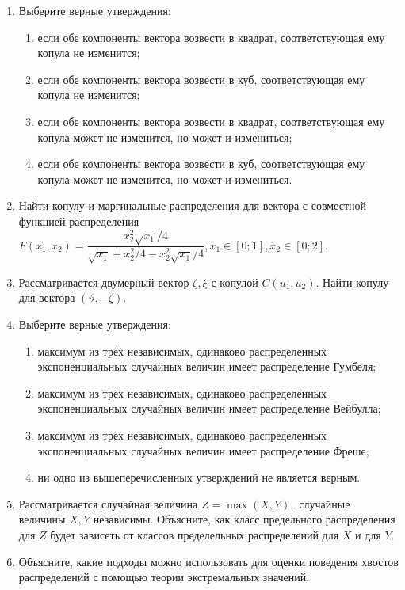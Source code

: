 \documentclass[12pt]{article}
\begin{document}
\begin{enumerate}
\item 
Выберите верные утверждения:
\begin{enumerate}
\setlength\itemsep{-0.15em}
    \item если обе компоненты вектора возвести в квадрат, соответствующая ему копула не изменится;
    \item если обе компоненты вектора возвести в куб, соответствующая ему копула не изменится;
    \item если обе компоненты вектора возвести в квадрат, соответствующая ему копула может не изменится, но может и измениться;
    \item если обе компоненты вектора возвести в куб, соответствующая ему копула может не изменится, но может и измениться.

\end{enumerate}

\item Найти копулу и маргинальные распределения для вектора с совместной функцией распределения $F(x_1,x_2)=\dfrac{x_2^2\sqrt{x_1}/4}{\sqrt{x_1}+x_2^2/4-x_2^2\sqrt{x_1}/4},x_1\in[0;1],x_2\in[0;2].$

 \item Рассматривается двумерный вектор $\zeta,\xi$ с копулой $C(u_1,u_2).$ Найти копулу для вектора $(\vartheta,-\zeta).$

\item Выберите верные утверждения:
\begin{enumerate}
\setlength\itemsep{-0.15em}
    \item максимум из трёх независимых, одинаково распределенных экспоненциальных случайных величин имеет распределение Гумбеля;
    \item максимум из трёх независимых, одинаково распределенных экспоненциальных случайных величин имеет распределение Вейбулла;
    \item максимум из трёх независимых, одинаково распределенных экспоненциальных случайных величин имеет распределение Фреше;
    \item ни одно из вышеперечисленных утверждений не является верным.
\end{enumerate}

\item Рассматривается случайная величина $Z=\max(X,Y),$ случайные величины $X,Y$ независимы. Объясните, как класс предельного распределения для $Z$ будет зависеть от классов пределельных распределений для $X$ и для $Y.$

\item Объясните, какие подходы можно использовать для оценки поведения хвостов распределений с помощью теории экстремальных значений.

\end{enumerate}
\end{document}
